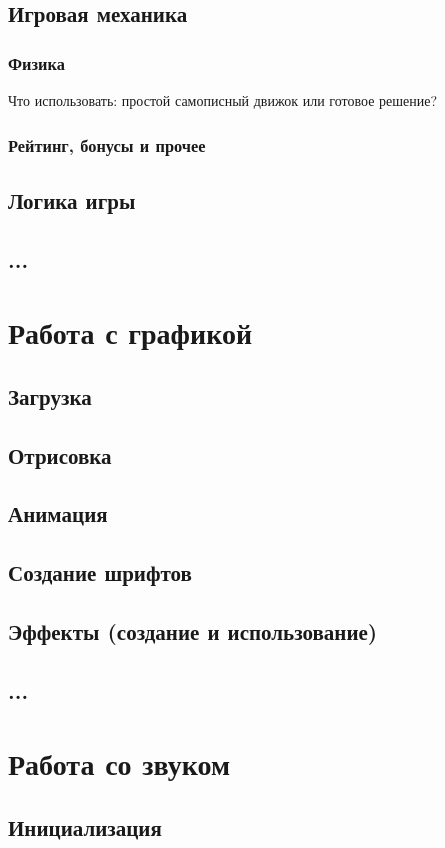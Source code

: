 \section{Игровая механика}
\subsection{Физика}
Что использовать: простой самописный движок или готовое решение?
\subsection{Рейтинг, бонусы и прочее}
\section{Логика игры}
\section{...}

\chapter{Работа с графикой}
\section{Загрузка}
\section{Отрисовка}
\section{Анимация}
\section{Создание шрифтов}
\section{Эффекты (создание и использование)}
\section{...}

\chapter{Работа со звуком}
\section{Инициализация}

